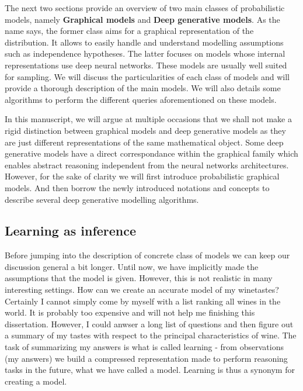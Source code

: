 The next two sections provide an overview of two main classes of probabilistic models, namely \textbf{Graphical models} and \textbf{Deep generative models}. As the name says, the former class aims for a graphical representation of the distribution. It allows to easily handle and understand modelling assumptions such as independence hypotheses. The latter focuses on models whose internal representations use deep neural networks. These models are usually well suited for sampling. We will discuss the particularities of each class of models and will provide a thorough description of the main models. We will also details some algorithms to perform the different queries aforementioned on these models.

In this manuscript, we will argue at multiple occasions that we shall not make a rigid distinction between graphical models and deep generative models as they are just different representations of the same mathematical object. Some deep generative models have a direct correspondance within the graphical family which enables abstract reasoning independent from the neural networks architectures. However, for the sake of clarity we will first introduce probabilistic graphical models. And then borrow the newly introduced notations and concepts to describe several deep generative modelling algorithms.

%

\subsection{Learning as inference}
Before jumping into the description of concrete class of models we can keep our discussion general a bit longer.
Until now, we have implicitly made the assumptions that the model is given. However, this is not realistic in many interesting settings. How can we create an accurate model of my winetastes? Certainly I cannot simply come by myself with a list ranking all wines in the world. It is probably too expensive and will not help me finishing this dissertation. However, I could anwser a long list of questions and then figure out a summary of my tastes with respect to the principal characteristics of wine. The task of summarizing my answers is what is called learning - from observations (my answers) we build a compressed representation made to perform reasoning tasks in the future, what we have called a model. Learning is thus a synonym for creating a model.

